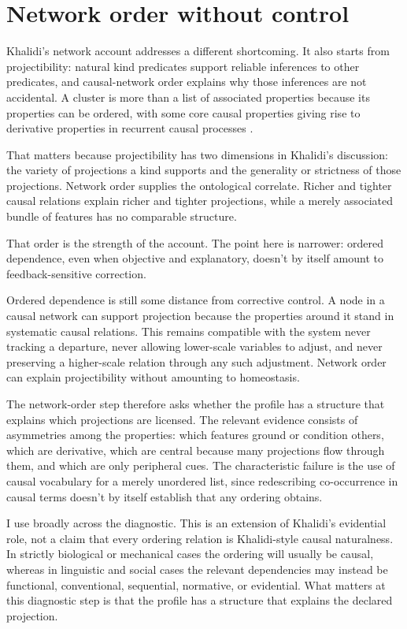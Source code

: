 \documentclass[12pt]{article}
\begin{document}
\section{Network order without control}

Khalidi's network account addresses a different shortcoming. It also starts from
projectibility: natural kind predicates support reliable inferences to other
predicates, and causal-network order explains why those inferences are not
accidental. A cluster is more than a list of associated properties because its
properties can be ordered, with some core causal properties giving rise to
derivative properties in recurrent causal processes
\citep{khalidi2013,khalidi2018nodes}.

That matters because projectibility has two dimensions in Khalidi's discussion:
the variety of projections a kind supports and the generality or strictness of
those projections. Network order supplies the ontological correlate. Richer and
tighter causal relations explain richer and tighter projections, while a merely
associated bundle of features has no comparable structure.

That order is the strength of the account. The point here is narrower:
ordered dependence, even when objective and explanatory, doesn't by itself amount
to feedback-sensitive correction.

Ordered dependence is still some distance from corrective control. A node in a
causal network can support projection because the properties around it stand in
systematic causal relations. This remains compatible with the system never
tracking a departure, never allowing lower-scale variables to adjust, and never
preserving a higher-scale relation through any such adjustment. Network order can
explain projectibility without amounting to homeostasis.

The network-order step therefore asks whether the profile has a structure that
explains which projections are licensed. The relevant evidence consists of
asymmetries among the properties: which features ground or condition others,
which are derivative, which are central because many projections flow through
them, and which are only peripheral cues. The characteristic failure is the use
of causal vocabulary for a merely unordered list, since redescribing
co-occurrence in causal terms doesn't by itself establish that any ordering
obtains.

I use  broadly across the diagnostic. This is an extension of
Khalidi's evidential role, not a claim that every ordering relation is
Khalidi-style causal naturalness. In strictly biological or mechanical cases the
ordering will usually be causal, whereas in linguistic and social cases the
relevant dependencies may instead be functional, conventional, sequential,
normative, or evidential. What matters at this diagnostic step is that the
profile has a structure that explains the declared projection.
\end{document}
